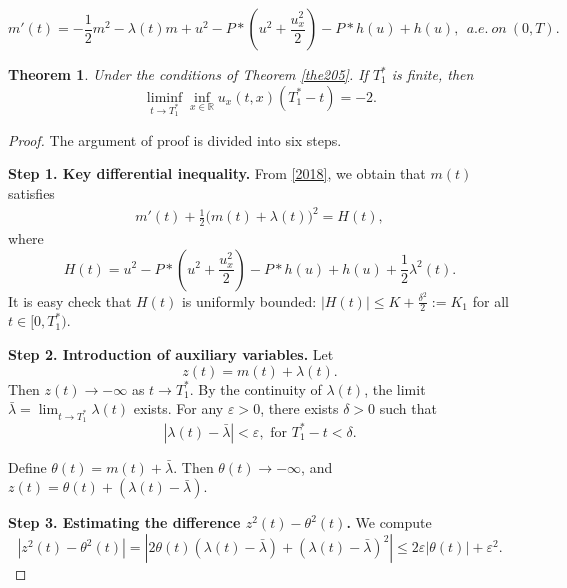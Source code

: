 \documentclass[10pt,a4paper]{amsart}
\newtheorem{theorem}{Theorem}
\begin{document}
\begin{equation}
m'(t)=-\frac{1}{2}m^{2}-\lambda(t) m +u^{2}-P\ast\left(u^{2}+\frac{u_{x}^{2}}{2}\right)
-P\ast h(u)+h(u),\ \ a.e.\ on\ (0,T).
\label{2018}
\end{equation}

\begin{theorem}
\label{the206}
Under the conditions of Theorem \ref{the205}. If $T_{1}^{\ast}$ is finite, then
\begin{equation*}
\liminf_{t\rightarrow T_{1}^{\ast}}\inf_{x\in \mathbb{R}}u_{x}(t,x)(T_{1}^{\ast}-t)=-2.
\end{equation*}
\end{theorem}

\begin{proof}
The argument of proof is divided into six steps.

\noindent\textbf{Step 1. Key differential inequality.}
From \eqref{2018}, we obtain that $m(t)$ satisfies
\begin{align}
m'(t) +\frac{1}{2} \big( m(t) + \lambda(t) \big)^2 = H(t),
\label{2022}
\end{align}
where $$H(t)=u^{2}-P\ast\left(u^{2}+\frac{u_{x}^{2}}{2}\right)
-P\ast h(u)+h(u)+\frac{1}{2}\lambda^{2}(t).$$ It is easy check that $H(t)$ is uniformly bounded: $|H(t)| \leq K+\frac{\delta^{2}}{2}:=K_{1}$ for all $t \in [0, T_{1}^*)$.

\noindent\textbf{Step 2. Introduction of auxiliary variables.}
Let $$z(t) = m(t) + \lambda(t).$$ Then $z(t) \to -\infty$ as $t \to T_{1}^*$. By the continuity of $\lambda(t)$, the limit $\bar\lambda = \lim_{t \to T_{1}^*} \lambda(t)$ exists. For any $\varepsilon > 0$, there exists $\delta > 0$ such that $$|\lambda(t) - \bar\lambda| < \varepsilon,\text{ for }T_{1}^* - t < \delta.$$

Define $\theta(t) = m(t) + \bar\lambda$. Then $\theta(t) \to -\infty$, and $z(t) = \theta(t) + (\lambda(t) - \bar\lambda)$.

\noindent\textbf{Step 3. Estimating the difference $z^2(t) - \theta^2(t)$.}
We compute
\begin{equation}
|z^2(t) - \theta^2(t)| = |2\theta(t)(\lambda(t) - \bar\lambda) + (\lambda(t) - \bar{\lambda})^2|
\leq 2\varepsilon |\theta(t)| + \varepsilon^2.
\label{2023}
\end{equation}



\end{proof}
\end{document}
